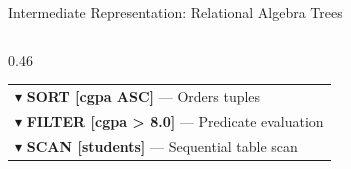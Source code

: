 \documentclass[aspectratio=169,10pt]{beamer}
\begin{document}
\begin{frame}{Intermediate Representation: Relational Algebra Trees}
\begin{columns}[T]
\begin{column}{0.46\textwidth}
\begin{center}
\begin{tabular}{|l|}
                $\blacktriangledown$ \textbf{SORT [cgpa ASC]} --- Orders tuples \\
                $\blacktriangledown$ \textbf{FILTER [cgpa > 8.0]} --- Predicate evaluation \\
                $\blacktriangledown$ \textbf{SCAN [students]} --- Sequential table scan \\
                \hline
            \end{tabular}
            \end{center}
        \end{column}
    \end{columns}
\end{frame}
\end{document}
